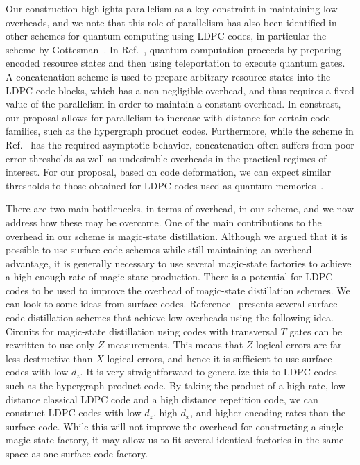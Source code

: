 \documentclass[reprint,
superscriptaddress,
 amsmath,amssymb,
 aps, longbibliography
]{revtex4-1}
\newcommand{\rev}[1]{{#1}}
\begin{document}
\rev{Our construction highlights parallelism as a key constraint in maintaining low overheads, and we note that this role of parallelism has also been identified in other schemes for quantum computing using LDPC codes, in particular the scheme by Gottesman~\cite{Gottesman14}. In Ref.~\cite{Gottesman14}, quantum computation proceeds by preparing encoded resource states and then using teleportation to execute quantum gates.  A concatenation scheme is used to prepare arbitrary resource states into the LDPC code blocks, which has a non-negligible overhead, and thus requires a fixed value of the parallelism in order to maintain a constant overhead.  In constrast, our proposal allows for parallelism to increase with distance for certain code families, such as the hypergraph product codes. Furthermore, while the scheme in Ref.~\cite{Gottesman14} has the required asymptotic behavior, concatenation often suffers from poor error thresholds as well as undesirable overheads in the practical regimes of interest. For our proposal, based on code deformation, we can expect similar thresholds to those obtained for LDPC codes used as quantum memories~\cite{tremblay2021constantoverhead}.}

There are two main bottlenecks, in terms of overhead, in our scheme, and we now address how these may be overcome. One of the main contributions to the overhead in our scheme is magic-state distillation. Although we argued that it is possible to use surface-code schemes while still maintaining an overhead advantage, it is generally necessary to use several magic-state factories to achieve a high enough rate of magic-state production. There is a potential for LDPC codes to be used to improve the overhead of magic-state distillation schemes.  We can look to some ideas from surface codes. Reference~\cite{Litinski19} presents several surface-code distillation schemes that achieve low overheads using the following idea. Circuits for magic-state distillation using codes with transversal $T$ gates can be rewritten to use only $Z$ measurements. This means that $Z$ logical errors are far less destructive than $X$ logical errors, and hence it is sufficient to use surface codes with low $d_z$. It is very straightforward to generalize this to LDPC codes such as the hypergraph product code. By taking the product of a high rate, low distance classical LDPC code and a high distance repetition code, we can construct LDPC codes with low $d_z$, high $d_x$, and higher encoding rates than the surface code. While this will not improve the overhead for constructing a single magic state factory, it may allow us to fit several identical factories in the same space as one surface-code factory.
\end{document}
